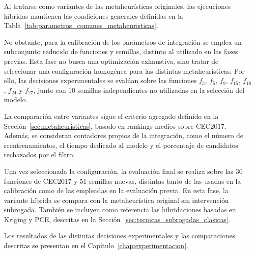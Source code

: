 Al tratarse como variantes de las metaheurísticas originales, las ejecuciones híbridas mantienen las condiciones generales definidas en la Tabla~\ref{tab:parametros_comunes_metaheuristicas}.

No obstante, para la calibración de los parámetros de integración se emplea un subconjunto reducido de funciones y semillas, distinto al utilizado en las fases previas. Esta fase no busca una optimización exhaustiva, sino tratar de seleccionar una
configuración homogénea para las distintas
metaheurísticas. Por ello, las decisiones experimentales se evalúan sobre las funciones \(f_3\), \(f_5\), \(f_9\), \(f_{15}\), \(f_{19}\), \(f_{24}\) y \(f_{27}\), junto con \(10\) semillas independientes no utilizadas en la selección del modelo.

La comparación entre variantes sigue el criterio agregado definido en la
Sección~\ref{sec:metaheuristicas}, basado en rankings medios sobre CEC2017. Además, se consideran contadores propios de la integración, como el número de reentrenamientos, el tiempo dedicado al modelo y el porcentaje de candidatos rechazados por el filtro.

Una vez seleccionada la configuración, la evaluación final se realiza sobre las \(30\) funciones de CEC2017 y \(51\) semillas nuevas, distintas tanto de las usadas en la calibración como de las empleadas en la evaluación previa. En esta fase, la variante híbrida se compara con la metaheurística original sin intervención subrogada. También se incluyen como referencia las hibridaciones basadas en Kriging y PCE, descritas en la Sección~\ref{sec:tecnicas_subrogadas_clasicas}.

Los resultados de las distintas decisiones experimentales y las comparaciones descritas se presentan en el Capítulo~\ref{chap:experimentacion}.








